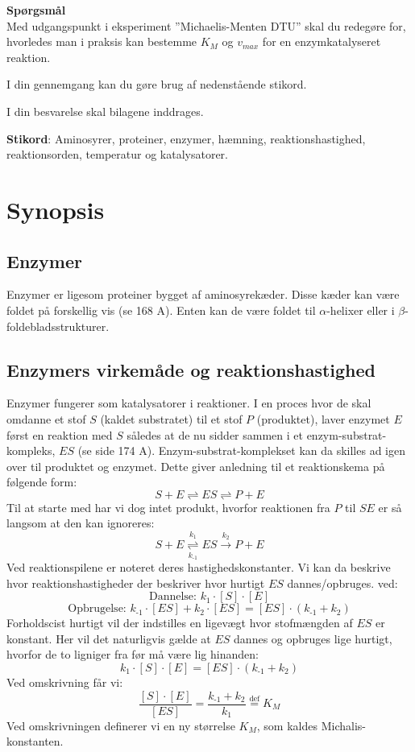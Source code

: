 \textbf{Spørgsmål}\\
Med udgangspunkt i eksperiment ”Michaelis-Menten DTU” skal du redegøre for, hvorledes man i praksis kan bestemme $K_M$ og $v_{max}$ for en enzymkatalyseret reaktion.

I din gennemgang kan du gøre brug af nedenstående stikord. 

I din besvarelse skal bilagene inddrages.

\vspace{.5cm}
\textbf{Stikord}: Aminosyrer, proteiner, enzymer, hæmning, reaktionshastighed, reaktionsorden, temperatur og katalysatorer.

\section*{Synopsis}
\subsection{Enzymer}
Enzymer er ligesom proteiner bygget af aminosyrekæder. 
Disse kæder kan være foldet på forskellig vis (se 168 A).
Enten kan de være foldet til $\alpha$-helixer eller i $\beta$-foldebladsstrukturer.

\subsection{Enzymers virkemåde og reaktionshastighed}
Enzymer fungerer som katalysatorer i reaktioner. 
I en proces hvor de skal omdanne et stof $S$ (kaldet substratet) til et stof $P$ (produktet), laver enzymet $E$ først en reaktion med $S$ således at de nu sidder sammen i et enzym-substrat-kompleks, $ES$ (se side 174 A).
Enzym-substrat-komplekset kan da skilles ad igen over til produktet og enzymet.
Dette giver anledning til et reaktionskema på følgende form:
$$ S + E \rightleftharpoons ES \rightleftharpoons P + E  $$
Til at starte med har vi dog intet produkt, hvorfor reaktionen fra $P$ til $SE$ er så langsom at den kan ignoreres:
$$ S + E \overset{k_1}{\underset{k_{\text{-}1}}{\rightleftharpoons}} ES \overset{k_2}{\rightarrow} P + E  $$
Ved reaktionspilene er noteret deres hastighedskonstanter. 
Vi kan da beskrive hvor reaktionshastigheder der beskriver hvor hurtigt $ES$ dannes/opbruges. 
ved:
$$\text{Dannelse: } k_1 \cdot [S] \cdot [E]$$
$$\text{Opbrugelse: } k_{\text{-}1} \cdot [ES] + k_2 \cdot [ES]=[ES]\cdot (k_{\text{-}1} + k_2)$$
Forholdscist hurtigt vil der indstilles en ligevægt hvor stofmængden af $ES$ er konstant. 
Her vil det naturligvis gælde at $ES$ dannes og opbruges lige hurtigt, hvorfor de to ligniger fra før må være lig hinanden:
$$ k_1 \cdot [S] \cdot [E] = [ES]\cdot (k_{\text{-}1} + k_2) $$
Ved omskrivning får vi:
$$ \dfrac{[S] \cdot [E]}{[ES]} = \dfrac{k_{\text{-}1} + k_2}{k_1 } \overset{\text{def}}{=} K_M $$
Ved omskrivningen definerer vi en ny størrelse $K_M$, som kaldes Michalis-konstanten.


